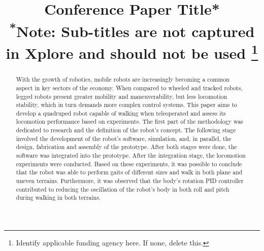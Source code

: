 \documentclass[conference]{IEEEtran}
\begin{document}
\title{Conference Paper Title*\\
{\footnotesize \textsuperscript{*}Note: Sub-titles are not captured in Xplore and
should not be used}
\thanks{Identify applicable funding agency here. If none, delete this.}
}

\author{
  \and
  \and
}

\maketitle

\begin{abstract}
  With the growth of robotics, mobile robots are increasingly becoming a common aspect in key sectors of the economy. When compared to wheeled and tracked robots, legged robots present greater mobility and maneuverability, but less locomotion stability, which in turn demands more complex control systems. This paper aims to develop a quadruped robot capable of walking when teleoperated and assess its locomotion performance based on experiments. The first part of the methodology was dedicated to research and the definition of the robot's concept. The following stage involved the development of the robot's software, simulation, and, in parallel, the design, fabrication and assembly of the prototype. After both stages were done, the software was integrated into the prototype. After the integration stage, the locomotion experiments were conducted. Based on these experiments, it was possible to conclude that the robot was able to perform gaits of different sizes and walk in both plane and uneven terrains. Furthermore, it was observed that the body's rotation PID controller contributed to reducing the oscillation of the robot's body in both roll and pitch during walking in both terrains.
\end{abstract}
\end{document}
